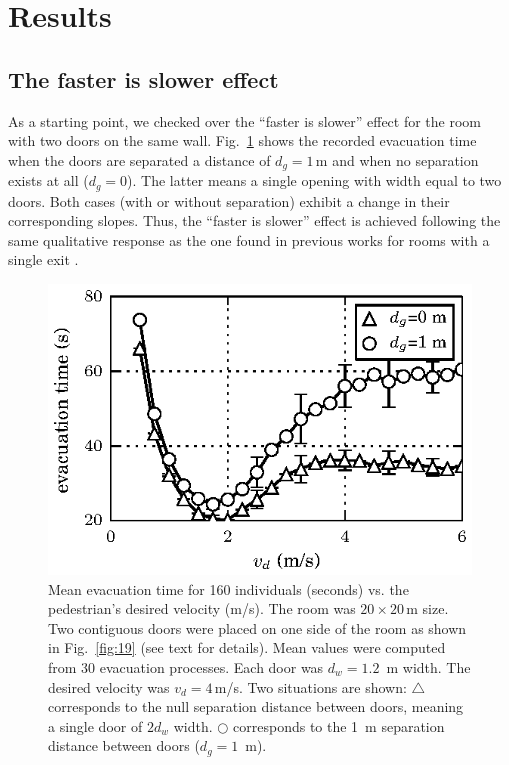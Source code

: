 \section{\label{results}Results}

\subsection{\label{faster_is_slower}The faster is slower effect}


As a starting point, we checked over the ``faster is slower'' effect for 
the room with two doors on the same wall. Fig.~\ref{fig:7} shows the 
recorded evacuation time when the doors are separated a distance of $d_g=1\,$m 
and when no separation exists at all ($d_g=0$). The latter means a single 
opening with width equal to two doors. Both cases (with or without separation) 
exhibit a change in their corresponding slopes. Thus, the ``faster is 
slower'' effect is achieved following the same qualitative response as the one 
found in previous works for rooms with a single exit \cite{Helbing1,Dorso1}.\\ 


\begin{figure}
\includegraphics[width=\columnwidth]{./fig1.eps}
\caption{\label{fig:7} Mean evacuation time for 160 individuals (seconds) 
vs. the pedestrian's desired velocity (m/s). The room was $20\times20\,$m 
size. Two contiguous doors were placed on one side of the room as shown in 
Fig.~\ref{fig:19} (see text for details). Mean values were computed from 30 
evacuation processes. Each door was $d_w=1.2$~m width. The desired velocity 
was $v_d=4\,$m/s. Two situations are shown:  $\bigtriangleup$ corresponds to 
the null separation distance between doors, meaning a single door of $2d_w$ 
width. $\bigcirc$ corresponds to the 1~m separation distance between doors  
($d_g=1$~m).   }
\end{figure}


